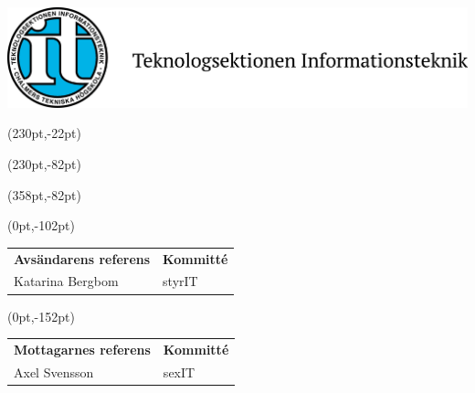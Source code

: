 \documentclass[a4paper,11pt]{article}
\begin{document}
\pagestyle{fancy}
\fancyhf{} %
\renewcommand{\headrulewidth}{0pt}
\renewcommand{\footrulewidth}{0pt}

\setlength{\fboxsep}{1.5em}
\setlength{\parindent}{0pt}

{\includegraphics[height=3\baselineskip]{sektionslogo.png}}



\fancyput*(230pt,-22pt){}

\fancyput*(230pt,-82pt){}

\fancyput*(358pt,-82pt){}

\vspace{3em}

\fancyput*(0pt,-102pt){
    \begin{minipage}{85pt}
      \begin{tabular}{ll}
        \textbf{Avsändarens referens} & \textbf{Kommitté}\\
         Katarina Bergbom & styrIT \\
      \end{tabular}
    \end{minipage}}
    

\fancyput*(0pt,-152pt){
    \begin{minipage}{85pt}
      \begin{tabular}{ll}
        \textbf{Mottagarnes referens} &  \textbf{Kommitté}\\
        Axel Svensson & sexIT \\
      \end{tabular}
    \end{minipage}}
\end{document}
